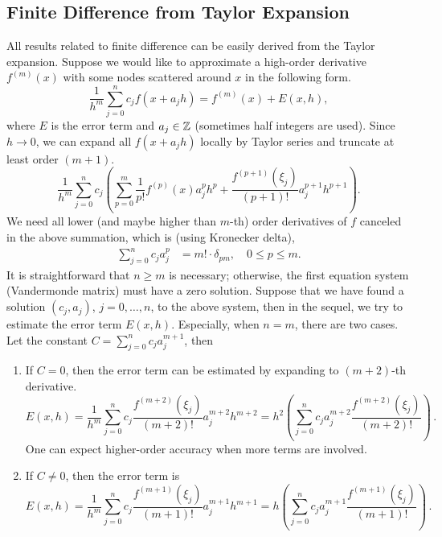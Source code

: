 \subsection{Finite Difference from Taylor Expansion}
All results related to finite difference can be easily derived from the Taylor expansion. Suppose we would like to approximate a high-order derivative $f^{(m)}(x)$ with some nodes scattered around $x$ in the following form. 
\begin{equation}
    \frac{1}{h^m} \sum_{j = 0}^n c_j f(x + a_j h) = f^{(m)}(x) + E(x, h),
\end{equation}
where $E$ is the error term and $a_j\in\mathbb Z$ (sometimes half integers are used). Since $h\to 0$, we can expand all $f(x + a_j h)$ locally by Taylor series and truncate at least order $(m+1)$.
\begin{equation}
    \frac{1}{h^m} \sum_{j=0}^n c_j \left( \sum_{p=0}^{m} \frac{1}{p!}f^{(p)}(x) a_j^p h^p + \frac{f^{(p+1)}(\xi_j)}{(p+1)!} a_j^{p+1} h^{p+1}\right).
\end{equation} 
We need all lower (and maybe higher than $m$-th) order derivatives of $f$ canceled in the above summation, which is (using Kronecker delta),
\begin{equation}
    \begin{aligned}
        \sum_{j=0}^n c_j a_j^p &= {m!} \cdot \delta_{pm}, \quad 0\le p \le m.
    \end{aligned}
\end{equation}
It is straightforward that $n \ge m$ is necessary; otherwise, the first equation system (Vandermonde matrix) must have a zero solution.  Suppose that we have found a solution $(c_j, a_j)$, $j=0,\dots, n$,  to the above system, then in the sequel, we try to estimate the error term $E(x, h)$. Especially, when $n = m$, there are two cases. Let the constant $C =  \sum_{j=0}^n c_j a_j^{m+1}$, then  
\begin{enumerate}
    \item If $C = 0$, then the error term can be estimated by expanding to $(m+2)$-th derivative. 
    \begin{equation}\label{EQ: ERROR FD}
        E(x, h) = \frac{1}{h^m}\sum_{j=0}^n c_j \frac{f^{(m+2)}(\xi_j)}{(m+2)!} a_j^{m+2} h^{m+2} = h^2 \left(\sum_{j=0}^n c_j  a_j^{m+2}\frac{f^{(m+2)}(\xi_j)}{(m+2)!}\right)\,.
    \end{equation}
    One can expect higher-order accuracy when more terms are involved. 
    \item If $C\neq 0$, then the error term is 
    \begin{equation}\label{EQ: ERROR FD NZERO}
        E(x, h) = \frac{1}{h^m}\sum_{j=0}^n c_j \frac{f^{(m+1)}(\xi_j)}{(m+1)!} a_j^{m+1} h^{m+1} = h \left(\sum_{j=0}^n c_j  a_j^{m+1}\frac{f^{(m+1)}(\xi_j)}{(m+1)!}\right)\,.
    \end{equation}
\end{enumerate}
